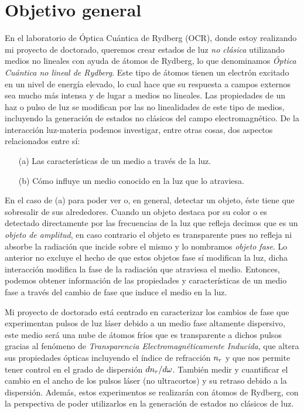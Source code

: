 \chapter{\label{cap:objetivo}Objetivo general}

En el laboratorio de Óptica Cuántica de Rydberg (OCR), donde estoy realizando mi proyecto de doctorado, queremos crear estados de luz \emph{no clásica} utilizando medios no lineales con ayuda de átomos de Rydberg, lo que denominamos \emph{Óptica Cuántica no lineal de Rydberg}. Este tipo de átomos tienen un electrón excitado en un nivel de energía elevado, lo cual hace que su respuesta a campos externos sea mucho más intensa y de lugar a medios no lineales. Las propiedades de un haz o pulso de luz se modifican por las no linealidades de este tipo de medios, incluyendo la generación de estados no clásicos del campo electromagnético. De la interacción luz-materia podemos investigar, entre otras cosas, dos aspectos relacionados entre sí:

\begin{itemize}
\item[(a)] Las características de un medio a través de la luz.
\item[(b)] Cómo influye un medio conocido en la luz que lo atraviesa.
\end{itemize}

En el caso de (a) para poder ver o, en general, detectar un objeto, éste tiene que sobresalir de sus alrededores. Cuando un objeto destaca por su color o es detectado directamente por las frecuencias de la luz que refleja decimos que es un \emph{objeto de amplitud}, en caso contrario el objeto es transparente pues no refleja ni absorbe la radiación que incide sobre el mismo y lo nombramos \emph{objeto fase}. Lo anterior no excluye el hecho de que estos objetos fase sí modifican la luz, dicha interacción modifica la fase de la radiación que atraviesa el medio. Entonces, podemos obtener información de las propiedades y características de un medio fase a través del cambio de fase que induce el medio en la luz.

\p Mi proyecto de doctorado está centrado en caracterizar los cambios de fase que experimentan pulsos de luz láser debido a un medio fase altamente dispersivo, este medio será una nube de átomos fríos que es transparente a dichos pulsos gracias al fenómeno de \emph{Transparencia Electromagnéticamente Inducida}, que altera sus propiedades ópticas incluyendo el índice de refracción $n_{r}$ y que nos permite tener control en el grado de dispersión $dn_{r}/d\omega$. También medir y cuantificar el cambio en el ancho de los pulsos láser (no ultracortos) y su retraso debido a la dispersión. Además, estos experimentos se realizarán con átomos de Rydberg, con la perspectiva de poder utilizarlos en la generación de estados no clásicos de luz.

